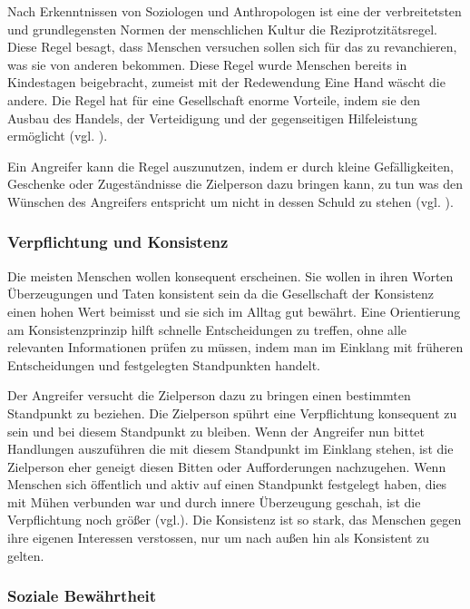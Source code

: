 \glqq Nach Erkenntnissen von Soziologen und Anthropologen ist eine der verbreitetsten und grundlegensten Normen der menschlichen Kultur die Reziprotzitätsregel. Diese Regel besagt, dass Menschen versuchen sollen sich für das zu revanchieren, was sie von anderen bekommen.\grqq{} \cite{PsychDesÜberzeugensRezi} Diese Regel wurde Menschen bereits in Kindestagen beigebracht, zumeist mit der Redewendung \glqq Eine Hand wäscht die andere\grqq{}. Die Regel hat für eine Gesellschaft enorme Vorteile, indem sie den Ausbau des Handels, der Verteidigung und der gegenseitigen Hilfeleistung ermöglicht (vgl. \cite{rezi}). 

Ein Angreifer kann die Regel auszunutzen, indem er durch kleine Gefälligkeiten, Geschenke oder Zugeständnisse die Zielperson dazu bringen kann, zu tun was den Wünschen des Angreifers entspricht um nicht in dessen Schuld zu stehen (vgl. \cite{rezi}).


\subsubsection{Verpflichtung und Konsistenz}

Die meisten Menschen wollen konsequent erscheinen. Sie wollen in ihren Worten Überzeugungen und Taten konsistent sein da die Gesellschaft der Konsistenz einen hohen Wert beimisst und sie sich im Alltag gut bewährt. Eine Orientierung am Konsistenzprinzip hilft schnelle Entscheidungen zu treffen, ohne alle relevanten Informationen prüfen zu müssen, indem man im Einklang mit früheren Entscheidungen und festgelegten Standpunkten handelt.    

Der Angreifer versucht die Zielperson dazu zu bringen einen bestimmten Standpunkt zu beziehen. Die Zielperson spührt eine Verpflichtung konsequent zu sein und bei diesem Standpunkt zu bleiben. Wenn der Angreifer nun bittet Handlungen auszuführen die mit diesem Standpunkt im Einklang stehen, ist die Zielperson eher geneigt diesen Bitten oder Aufforderungen nachzugehen. Wenn Menschen sich öffentlich und aktiv auf einen Standpunkt festgelegt haben, dies mit Mühen verbunden war und durch innere Überzeugung geschah, ist die Verpflichtung noch größer (vgl.\cite{PsychDesÜberzeugensCom}). \glqq Die Konsistenz ist so stark, das Menschen gegen ihre eigenen Interessen verstossen, nur um nach außen hin als Konsistent zu gelten.\grqq{} \cite{ComundKon}

\subsubsection{Soziale Bewährtheit}

